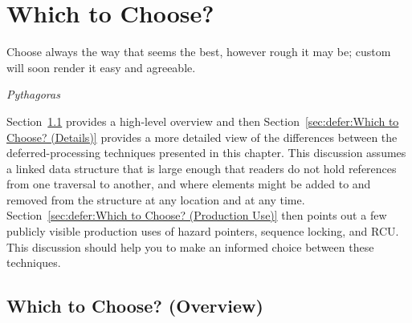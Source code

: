 
\section{Which to Choose?}
\label{sec:defer:Which to Choose?}
%
\epigraph{Choose always the way that seems the best, however rough it
	  may be; custom will soon render it easy and agreeable.}
	  {\emph{Pythagoras}}

Section~\ref{sec:defer:Which to Choose? (Overview)}
provides a high-level overview and then
Section~\ref{sec:defer:Which to Choose? (Details)}
provides a more detailed view
of the differences between the deferred-processing techniques presented
in this chapter.
This discussion assumes a linked data structure that is large enough
that readers do not hold references from one traversal to another,
and where elements might be added to and removed from the structure
at any location and at any time.
Section~\ref{sec:defer:Which to Choose? (Production Use)}
then points out a few publicly visible production uses of
hazard pointers, sequence locking, and RCU\@.
This discussion should help you to make an informed choice between
these techniques.

\subsection{Which to Choose? (Overview)}
\label{sec:defer:Which to Choose? (Overview)}

\begin{table*}
\renewcommand*{\arraystretch}{1.25}
\footnotesize
\centering\OneColumnHSpace{-.3in}
\caption{Which Deferred Technique to Choose? (Overview)}
\label{tab:defer:Which Deferred Technique to Choose? (Overview)}
\end{table*}

